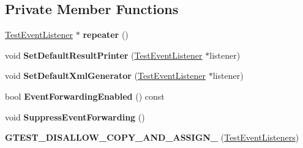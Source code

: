 \subsection*{Private Member Functions}
\begin{DoxyCompactItemize}
\item 
\mbox{\label{classtesting_1_1_test_event_listeners_a3de1e101514bdba3e74b93adc604e9c4}} 
\hyperlink{classtesting_1_1_test_event_listener}{Test\+Event\+Listener} $\ast$ {\bfseries repeater} ()
\item 
\mbox{\label{classtesting_1_1_test_event_listeners_aeaab55da7c18c35fb12c27c18ff99955}} 
void {\bfseries Set\+Default\+Result\+Printer} (\hyperlink{classtesting_1_1_test_event_listener}{Test\+Event\+Listener} $\ast$listener)
\item 
\mbox{\label{classtesting_1_1_test_event_listeners_a36dbac47563ef8bb78cb467d11f5b4d9}} 
void {\bfseries Set\+Default\+Xml\+Generator} (\hyperlink{classtesting_1_1_test_event_listener}{Test\+Event\+Listener} $\ast$listener)
\item 
\mbox{\label{classtesting_1_1_test_event_listeners_aa1878baf16a50f30f6435fad3c68ef3f}} 
bool {\bfseries Event\+Forwarding\+Enabled} () const
\item 
\mbox{\label{classtesting_1_1_test_event_listeners_a7132550dc1c50bb3399a6d6d3fc9be3d}} 
void {\bfseries Suppress\+Event\+Forwarding} ()
\item 
\mbox{\label{classtesting_1_1_test_event_listeners_a31d12292abc277dedbb7dc7748a6a60e}} 
{\bfseries G\+T\+E\+S\+T\+\_\+\+D\+I\+S\+A\+L\+L\+O\+W\+\_\+\+C\+O\+P\+Y\+\_\+\+A\+N\+D\+\_\+\+A\+S\+S\+I\+G\+N\+\_\+} (\hyperlink{classtesting_1_1_test_event_listeners}{Test\+Event\+Listeners})
\end{DoxyCompactItemize}
